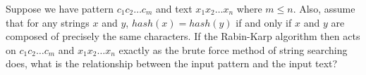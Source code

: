 Suppose we have pattern $c_{1}c_{2} \ldots  c_{m}$ and text
$x_{1}x_{2} \ldots  x_{n}$ where $m \leq  n$.  Also, assume that for any strings
$x$ and $y$, $hash(x)=hash(y)$ 
if and only if $x$ and $y$ are composed of precisely the same characters.
If the Rabin-Karp algorithm then acts on $c_{1}c_{2} \ldots  c_{m}$ and
$x_{1}x_{2} \ldots  x_{n}$ exactly as the brute force method of string 
searching does, what is the relationship between the input pattern and the 
input text?
